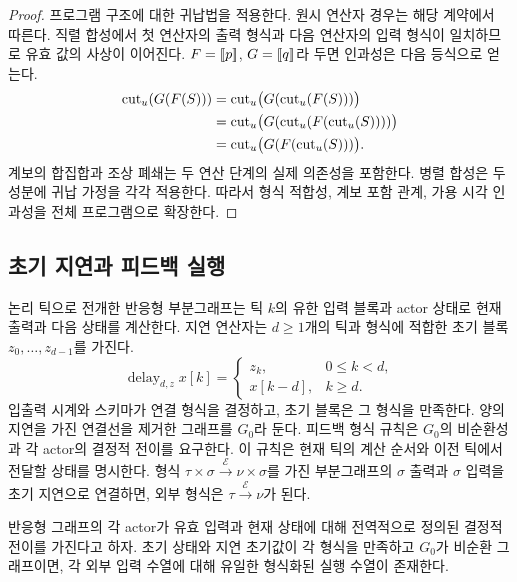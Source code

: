 \begin{proof}
프로그램 구조에 대한 귀납법을 적용한다. 원시 연산자 경우는 해당 계약에서 따른다.
직렬 합성에서 첫 연산자의 출력 형식과 다음 연산자의 입력 형식이 일치하므로
유효 값의 사상이 이어진다. $F=\mathopen{[\![}p\mathclose{]\!]}$, $G=\mathopen{[\![}q\mathclose{]\!]}$라 두면
인과성은 다음 등식으로 얻는다.
\begin{align*}
 \operatorname{cut}_u(G(F(S)))
 &=\operatorname{cut}_u\bigl(G(\operatorname{cut}_u(F(S)))\bigr)\\
 &=\operatorname{cut}_u\bigl(G(\operatorname{cut}_u(F(\operatorname{cut}_u(S))))\bigr)\\
 &=\operatorname{cut}_u\bigl(G(F(\operatorname{cut}_u(S)))\bigr).
\end{align*}
계보의 합집합과 조상 폐쇄는 두 연산 단계의 실제 의존성을 포함한다.
병렬 합성은 두 성분에 귀납 가정을 각각 적용한다.
따라서 형식 적합성, 계보 포함 관계, 가용 시각 인과성을 전체 프로그램으로 확장한다.
\end{proof}

\subsection{초기 지연과 피드백 실행}

논리 틱으로 전개한 반응형 부분그래프는 틱 $k$의 유한 입력 블록과 actor 상태로
현재 출력과 다음 상태를 계산한다. 지연 연산자는 $d\ge1$개의 틱과
형식에 적합한 초기 블록 $z_0,\ldots,z_{d-1}$를 가진다.
\begin{equation}
 \operatorname{delay}_{d,z}x[k]
 =\begin{cases}
 z_k,&0\le k<d,\\
 x[k-d],&k\ge d.
 \end{cases}
 \label{eq:initialized-delay}
\end{equation}
입출력 시계와 스키마가 연결 형식을 결정하고, 초기 블록은 그 형식을 만족한다.
양의 지연을 가진 연결선을 제거한 그래프를 $G_0$라 둔다.
피드백 형식 규칙은 $G_0$의 비순환성과 각 actor의 결정적 전이를 요구한다.
이 규칙은 현재 틱의 계산 순서와 이전 틱에서 전달할 상태를 명시한다.
형식 $\tau\times\sigma\xrightarrow{\mathcal E}\nu\times\sigma$를 가진
부분그래프의 $\sigma$ 출력과 $\sigma$ 입력을 초기 지연으로 연결하면,
외부 형식은 $\tau\xrightarrow{\mathcal E}\nu$가 된다.

\begin{proposition}
반응형 그래프의 각 actor가 유효 입력과 현재 상태에 대해
전역적으로 정의된 결정적 전이를 가진다고 하자.
초기 상태와 지연 초기값이 각 형식을 만족하고 $G_0$가 비순환 그래프이면,
각 외부 입력 수열에 대해 유일한 형식화된 실행 수열이 존재한다.
\end{proposition}

